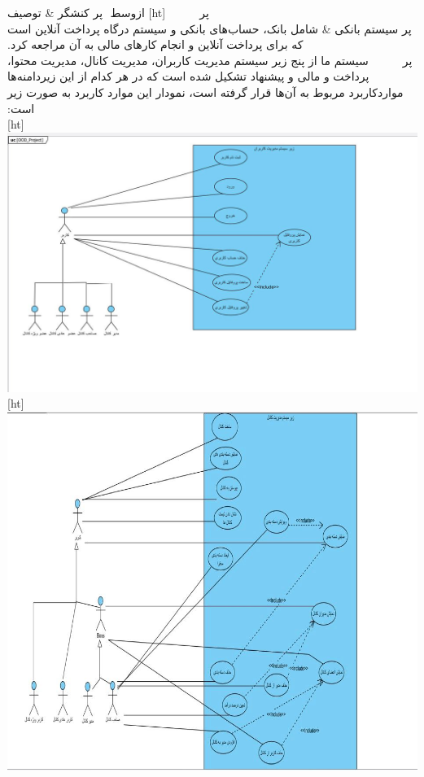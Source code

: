 ‫
‫‌پر
‫
‫‫
‫
‫
‫
‫\FloatBarrier
‫
‫
‫[ht]
‫‌ازوسط
‫
‫‌پر 
‫ کنشگر &  توصیف \\ 
‫‌پر
‫سیستم بانکی & شامل بانک، حساب‌های بانکی و سیستم درگاه پرداخت آنلاین است که برای پرداخت آنلاین و انجام کار‌های مالی به آن مراجعه کرد.\\ 
‫
‫‌پر
‫
‫‫
‫
‫
‫
‫‫\FloatBarrier
‫
‫
‫سیستم ما از پنج زیر سیستم مدیریت کاربران، مدیریت کانال، مدیریت محتوا، پرداخت و مالی و پیشنهاد تشکیل شده است که در هر کدام از این زیردامنه‌ها مواردکاربرد مربوط به آن‌ها قرار گرفته است، نمودار این موارد کاربرد به صورت زیر است:
‫\\
‫
‫[ht]
\includegraphics[scale=0.3]{figs/user_subsys.jpeg}
‫
‫
‫
\FloatBarrier
‫[ht]
\includegraphics[scale=0.4]{figs/channel_subsys.jpeg}
